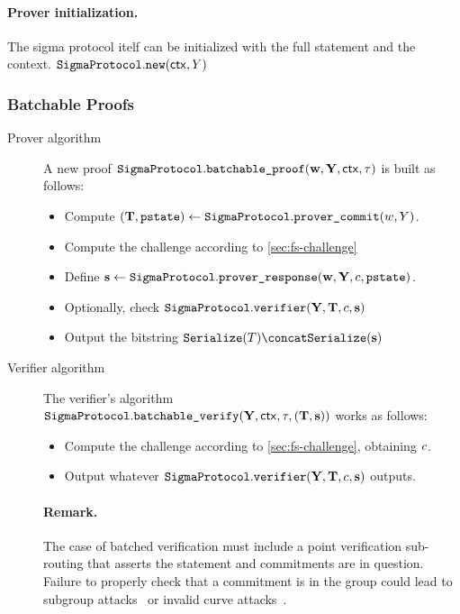 \documentclass[runningheads,11pt]{article}
\begin{document}
\paragraph{Prover initialization.}
  The sigma protocol itelf can be initialized with the full statement and the context. $\texttt{SigmaProtocol}.\texttt{new}(\mathsf{ctx}, Y)$

\subsubsection{Batchable Proofs}
\begin{description}
\item[Prover algorithm]
A new proof $\texttt{SigmaProtocol}.\texttt{batchable\_proof}(\mathbf {w}, \mathbf {Y},\mathsf{ctx}, \tau)$ is built as follows:
\begin{itemize}
\item
  Compute $(\mathbf {T},\texttt{pstate})\gets\texttt{SigmaProtocol}.\texttt{prover\_commit}(w, Y)$.
\item
  Compute the challenge according to \cref{sec:fs-challenge}
\item
  Define $\mathbf {s}\gets\texttt{SigmaProtocol}.\texttt{prover\_response}(\mathbf {w}, \mathbf {Y},c,\texttt{pstate})$.
  \item Optionally, check $\texttt{SigmaProtocol}.\texttt{verifier}(\mathbf {Y}, \mathbf {T}, c, \mathbf {s})$
\item
  Output the bitstring $\serialize(\commitment) \concat \serialize(\vec \response)$
\end{itemize}
\item[Verifier algorithm] The verifier's algorithm $\texttt{SigmaProtocol}.\texttt{batchable\_verify}(\mathbf {Y}, \mathsf{ctx}, \tau, (\mathbf {T},\mathbf s))$ works as follows:
\begin{itemize}
  \item
    Compute the challenge according to \cref{sec:fs-challenge}, obtaining $c$.
  \item
    Output whatever $\texttt{SigmaProtocol}.\texttt{verifier}(\mathbf {Y},\mathbf {T},c,\mathbf {s})$ outputs.
\end{itemize}
\paragraph{Remark.}
The case of batched verification must include a point verification sub-routing that asserts the statement and commitments are in question. Failure to properly check that a commitment is in the group could lead to subgroup attacks~\cite{EC:VanWie96,C:LimLee97} or invalid curve attacks~\cite{C:BieMeyMul00,RSA:BBPV12}.

\end{description}
\end{document}
